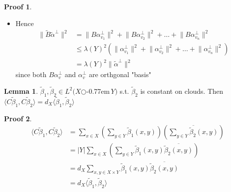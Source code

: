 \documentclass{book}
\newcommand{\zigzag}{$\bigcirc$\kern-0.77em\raisebox{-.16ex}{\small Z}$\,$}
\newcommand{\inner}[1]{\langle #1 \rangle}
\newcommand{\norm}[1]{\lVert #1 \rVert}
\newcommand{\abs}[1]{\lvert #1 \rvert }
\theoremstyle{definition}
\newtheorem{lemma}{Lemma}[chapter]
\theoremstyle{remarkstyle}
\newtheorem*{myproof}{Proof}%
\begin{document}
\begin{myproof}
\begin{itemize}
        \item Hence
        \begin{align*}
            \norm{\tilde{B}\tilde{\alpha}^{\perp}}^{2} 
            &= \norm{B\alpha^{\perp}_{v_1}}^{2} + \norm{B\alpha^{\perp}_{v_2}}^{2} + \dots + \norm{B\alpha^{\perp}_{v_n}}^{2} \\
            &\le \lambda(Y)^{2}\left(\norm{\alpha^{\perp}_{v_1}}^{2} + \norm{\alpha^{\perp}_{v_2}}^{2} + \dots + \norm{\alpha^{\perp}_{v_n}}^{2} \right)\\
            &= \lambda(Y)^{2}\norm{\tilde{\alpha}^{\perp}}^{2}
        \end{align*}
        since both $B\alpha^{\perp}_{v} $ and $\alpha^{\perp}_{v} $ are orthgonal "basis" \newline
    \end{itemize}
\end{myproof}

\begin{lemma}
    $\tilde{\beta}_1,\tilde{\beta}_2\in L^{2}(X$\zigzag$Y)$ s.t. $\tilde{\beta}_2$ is constant on clouds. Then $\inner{C\tilde{\beta}_1, C\tilde{\beta}_2}=d_X\inner{\tilde{\beta}_1,\tilde{\beta}_2}$
\end{lemma}
\begin{myproof}
    \begin{align*}
        \inner{C\tilde{\beta}_1, C\tilde{\beta}_2}
        &= \sum_{x\in X} \left(\sum_{y\in Y}\tilde{\beta}_1(x,y)\right) \left(\overline{\sum_{y\in Y} \tilde{\beta}_2(x,y)}\right) \\
        &= \abs{Y}\sum_{x\in X}\left(\sum_{y\in Y}\tilde{\beta}_1(x,y)\overline{\tilde{\beta}_2(x,y)}\right) \\
        &= d_X\sum_{x,y\in X\times Y}\tilde{\beta}_1(x,y)\overline{\tilde{\beta}_2(x,y)} \\
        &= d_X\inner{\tilde{\beta}_1,\tilde{\beta}_2}
    \end{align*}
    \newline
\end{myproof}
\end{document}
